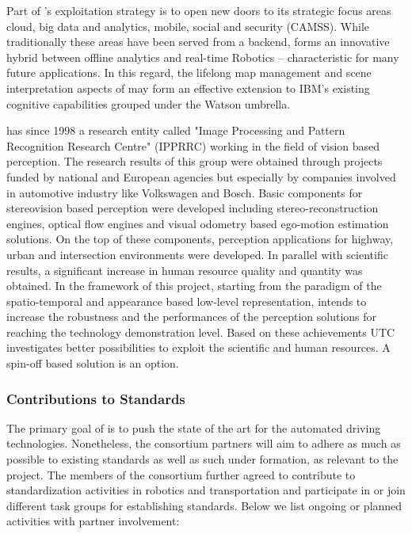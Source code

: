 Part of \IBM's exploitation strategy is to open new doors to its strategic focus areas cloud, big data and analytics, mobile, social and security (CAMSS). While traditionally these areas have been served from a  backend, \Project{} forms an innovative hybrid between offline analytics and real-time Robotics -- characteristic for many future applications. In this regard, the lifelong map management and scene interpretation aspects of \Project{} may form an effective extension to IBM's existing cognitive capabilities grouped under the Watson umbrella.

\CLUJ has since 1998 a research entity called "Image Processing and Pattern Recognition Research Centre" (IPPRRC) working in the field of vision based perception. The research results of this group were obtained through projects funded by national and European agencies but especially by companies involved in automotive industry like Volkswagen and Bosch. 
Basic components for stereovision based perception were developed including stereo-reconstruction engines, optical flow engines and visual odometry based ego-motion estimation solutions. On the top of these components, perception applications for highway, urban and intersection environments were developed. In parallel with scientific results, a significant increase in human resource quality and quantity was obtained. 
In the framework of this project, starting from the paradigm of the spatio-temporal and appearance based low-level representation, \CLUJ intends to increase the robustness and the performances of the perception solutions for reaching the technology demonstration level. 
Based on these achievements UTC investigates better possibilities to exploit the scientific and human resources. A spin-off based solution is an option.




\subsubsection{Contributions to Standards}
The primary goal of \Project is to push the state of the art for the automated driving technologies. Nonetheless, the consortium partners will aim to adhere as much as possible to existing standards as well as such under formation, as relevant to the project. The members of the consortium further agreed to contribute to standardization activities in robotics and transportation and participate in or join different task groups for establishing standards. Below we list ongoing or planned activities with partner involvement:

